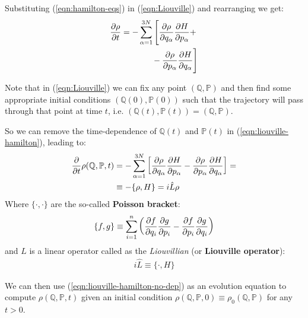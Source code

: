 \documentclass[../template.tex]{subfiles}
\begin{document}
\medskip


Substituting (\ref{eqn:hamilton-eqs}) in (\ref{eqn:Liouville}) and rearranging we get:
\begin{align} \nonumber
    \pdv{\rho}{t} (\mathbb{Q}(t), \mathbb{P}(t),t) &= -\sum_{\alpha=1}^{3N} \Bigg[\pdv{\rho}{q_\alpha} (\mathbb{Q}(t), \mathbb{P}(t),t) \pdv{H}{p_\alpha} (\mathbb{Q}(t), \mathbb{P}(t)) + \\
    &\quad\>\>\hphantom{\sum_{\alpha=1}^{3N}\Bigg[} - \pdv{\rho}{p_\alpha} (\mathbb{Q}(t), \mathbb{P}(t),t) \pdv{H}{q_\alpha} (\mathbb{Q}(t), \mathbb{P}(t))
    \Bigg] \label{eqn:liouville-hamilton} 
\end{align}

Note that in (\ref{eqn:Liouville}) we can fix any point $(\mathbb{Q},\mathbb{P})$ and then find some appropriate initial conditions $(\mathbb{Q}(0), \mathbb{P}(0))$ such that the trajectory will pass through that point at time $t$, i.e. $(\mathbb{Q}(t), \mathbb{P}(t)) = (\mathbb{Q},\mathbb{P})$. 

So we can remove the time-dependence of $\mathbb{Q}(t)$ and $\mathbb{P}(t)$ in (\ref{eqn:liouville-hamilton}), leading to:
\begin{align}\label{eqn:liouville-hamilton-no-dep}
    \pdv{t} \rho(\mathbb{Q},\mathbb{P},t) &= - \sum_{\alpha=1}^{3N} \left[\pdv{\rho}{q_\alpha} (\mathbb{Q},\mathbb{P},t) \pdv{H}{p_\alpha} (\mathbb{Q},\mathbb{P})
    - \pdv{\rho}{p_\alpha} (\mathbb{Q},\mathbb{P},t) \pdv{H}{q_\alpha} (\mathbb{Q},\mathbb{P})
    \right] =\\ \nonumber
    &\equiv - \{\rho, H\} = i \hat{L} \rho
\end{align}
Where $\{\cdot, \cdot\}$ are the so-called \textbf{Poisson bracket}:
\begin{align*}
    \{f,g\} \equiv \sum_{i=1}^n \left(\pdv{f}{q_i} \pdv{g}{p_i} - \pdv{f}{p_i} \pdv{g}{q_i}\right)
\end{align*} 
and $\hat{L}$ is a linear operator called as the \textit{Liouvillian} (or \textbf{Liouville operator}):
\begin{align*}
    i \hat{L} \equiv \{\cdot, H\}
\end{align*}

We can then use (\ref{eqn:liouville-hamilton-no-dep}) as an evolution equation to compute $\rho(\mathbb{Q},\mathbb{P},t)$ given an initial condition $\rho(\mathbb{Q},\mathbb{P},0) \equiv \rho_0(\mathbb{Q},\mathbb{P})$ for any $t > 0$.
\end{document}

